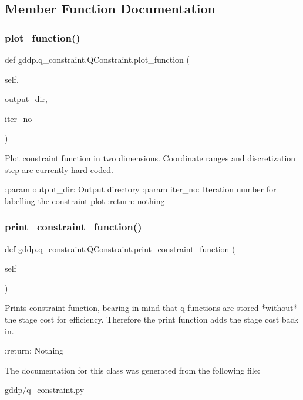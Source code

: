 \subsection{Member Function Documentation}
\mbox{\label{classgddp_1_1q__constraint_1_1_q_constraint_ad96e08f2921254849ee8763a1b84bad9}} 
\subsubsection{\texorpdfstring{plot\_function()}{plot\_function()}}
{\footnotesize\ttfamily def gddp.\+q\+\_\+constraint.\+Q\+Constraint.\+plot\+\_\+function (\begin{DoxyParamCaption}\item[{}]{self,  }\item[{}]{output\+\_\+dir,  }\item[{}]{iter\+\_\+no }\end{DoxyParamCaption})}

\begin{DoxyVerb}Plot constraint function in two dimensions. Coordinate ranges and discretization step
are currently hard-coded.

:param output_dir: Output directory
:param iter_no: Iteration number for labelling the constraint plot
:return: nothing
\end{DoxyVerb}
 \mbox{\label{classgddp_1_1q__constraint_1_1_q_constraint_a266f8b4749eb6c8476ce40112de8bda7}} 
\subsubsection{\texorpdfstring{print\_constraint\_function()}{print\_constraint\_function()}}
{\footnotesize\ttfamily def gddp.\+q\+\_\+constraint.\+Q\+Constraint.\+print\+\_\+constraint\+\_\+function (\begin{DoxyParamCaption}\item[{}]{self }\end{DoxyParamCaption})}

\begin{DoxyVerb}Prints constraint function, bearing in mind that q-functions are stored *without* the
stage cost for efficiency. Therefore the print function adds the stage cost back in.

:return: Nothing
\end{DoxyVerb}
 

The documentation for this class was generated from the following file\+:\begin{DoxyCompactItemize}
\item 
gddp/q\+\_\+constraint.\+py\end{DoxyCompactItemize}
